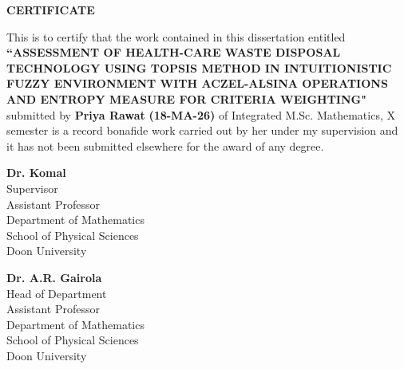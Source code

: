 \begin{center}
  {\LARGE{\bf{CERTIFICATE}}}
\end{center}

\vspace{2em}

This is to certify that the work contained in this dissertation entitled \textbf{\MakeUppercase{``ASSESSMENT OF HEALTH-CARE WASTE DISPOSAL TECHNOLOGY using TOPSIS Method in Intuitionistic Fuzzy Environment with Aczel-Alsina 
Operations and Entropy Measure for Criteria Weighting"}}  submitted by \textbf{Priya Rawat} \textbf{(18-MA-26)} of Integrated M.Sc. Mathematics, X semester is a record bonafide work carried out by her under my supervision and it has not been submitted elsewhere for the award of any degree.


\vspace{28em}

\begin{minipage}{2.5in}
\textbf{Dr. Komal} \\
Supervisor \\
Assistant Professor \\
Department of Mathematics \\
School of Physical Sciences \\
Doon University
\end{minipage}
\hfill
\begin{minipage}{2.5in}
\textbf{Dr. A.R. Gairola} \\
Head of Department \\
Assistant Professor \\
Department of Mathematics \\
School of Physical Sciences \\
Doon University
\end{minipage}

\clearpage
